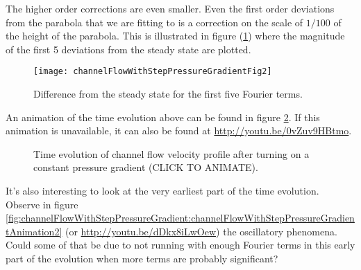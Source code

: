 The higher order corrections are even smaller.  Even the first order deviations from the parabola that we are fitting to is a correction on the scale of $1/100$ of the height of the parabola.  This is illustrated in figure (\ref{fig:channelFlowWithStepPressureGradient:channelFlowWithStepPressureGradientFig2}) where the magnitude of the first 5 deviations from the steady state are plotted.

\begin{figure}[htp]
   \centering
   \texttt{[image: channelFlowWithStepPressureGradientFig2]}
   \caption{Difference from the steady state for the first five Fourier terms.}
   \label{fig:channelFlowWithStepPressureGradient:channelFlowWithStepPressureGradientFig2}
\end{figure}

An animation of the time evolution above can be found in figure \ref{fig:channelFlowWithStepPressureGradient:channelFlowWithStepPressureGradientAnimation1}.  If this animation is unavailable, it can also be found at \href{http://youtu.be/0vZuv9HBtmo}{http://youtu.be/0vZuv9HBtmo}.

\begin{figure}[htp]
   \centering
{}
   \caption{Time evolution of channel flow velocity profile after turning on a constant pressure gradient (CLICK TO ANIMATE).}
   \label{fig:channelFlowWithStepPressureGradient:channelFlowWithStepPressureGradientAnimation1}
\end{figure}

It's also interesting to look at the very earliest part of the time evolution.  Observe in figure \ref{fig:channelFlowWithStepPressureGradient:channelFlowWithStepPressureGradientAnimation2} (or \href{http://youtu.be/dDkx8iLwOew}{http://youtu.be/dDkx8iLwOew}) the oscillatory phenomena.  Could some of that be due to not running with enough Fourier terms in this early part of the evolution when more terms are probably significant?

